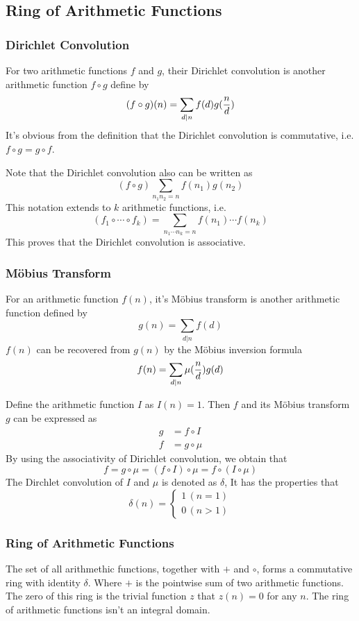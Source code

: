 \subsection{Ring of Arithmetic Functions}
\subsubsection*{Dirichlet Convolution}
For two arithmetic functions $f$ and $g$, their Dirichlet convolution
is another arithmetic function $f \circ g$ define by
$$(f \circ g)(n) = \sum_{d \vert n} f(d) g({n \over d})$$
It's obvious from the definition that the Dirichlet convolution is commutative,
i.e. $f \circ g = g \circ f$.

Note that the Dirichlet convolution also can be written as
$$(f \circ g) \sum_{n_1 n_2 = n} f(n_1) g(n_2)$$
This notation extends to $k$ arithmetic functions,
i.e. $$(f_1 \circ \cdots \circ f_k) = \sum_{n_1 \cdots n_k = n} f(n_1) \cdots f(n_k)$$
This proves that the Dirichlet convolution is associative.

\subsubsection*{M\"obius Transform}
For an arithmetic function $f(n)$, it's M\"obius transform is another arithmetic function
defined by $$g(n) = \sum_{d \vert n} f(d)$$
$f(n)$ can be recovered from $g(n)$ by the M\"obius inversion formula
$$f(n) = \sum_{d \vert n} \mu({n \over d}) g(d)$$

Define the arithmetic function $I$ as $I(n) = 1$.
Then $f$ and its M\"obius transform $g$ can be expressed as
\begin{align*}
  g &= f \circ I \\
  f &= g \circ \mu
\end{align*}
By using the associativity of Dirichlet convolution, we obtain that
$$f = g \circ \mu = (f \circ I) \circ \mu = f \circ (I \circ \mu)$$
The Dirchlet convolution of $I$ and $\mu$ is denoted as $\delta$,
It has the properties that
\begin{equation*}
  \delta(n) =
  \begin{cases}
    1 \, (n = 1) \\
    0 \, (n > 1)
  \end{cases}
\end{equation*}

\subsubsection*{Ring of Arithmetic Functions}
The set of all arithmethic functions, together with $+$ and $\circ$, forms a commutative ring with identity $\delta$.
Where $+$ is the pointwise sum of two arithmetic functions.
The zero of this ring is the trivial function $z$ that $z(n) = 0$ for any $n$.
The ring of arithmetic functions isn't an integral domain.

